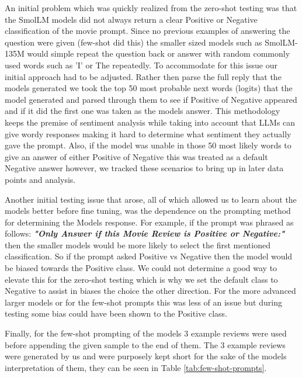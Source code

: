 \documentclass[10pt,twocolumn,letterpaper]{article}
\begin{document}
An initial problem which was quickly realized from the zero-shot testing was that the SmolLM models did not always return a clear Positive or Negative classification of the movie prompt. Since no previous examples of answering the question were given (few-shot did this) the smaller sized models such as SmolLM-135M would simple repeat the question back or answer with random commonly used words such as 'I' or The repeatedly. To accommodate for this issue our initial approach had to be adjusted. Rather then parse the full reply that the models generated we took the top 50 most probable next words (logits) that the model generated and parsed through them to see if Positive of Negative appeared and if it did the first one was taken as the models answer. This methodology keeps the premise of sentiment analysis while taking into account that LLMs can give wordy responses making it hard to determine what sentiment they actually gave the prompt. Also, if the model was unable in those 50 most likely words to give an answer of either Positive of Negative this was treated as a default Negative answer however, we tracked these scenarios to bring up in later data points and analysis. 

Another initial testing issue that arose, all of which allowed us to learn about the models better before fine tuning, was the dependence on the prompting method for determining the Models response. For example, if the prompt was phrased as follows: \textit{\textbf{"Only Answer if this Movie Review is Positive or Negative:"}} then the smaller models would be more likely to select the first mentioned classification. So if the prompt asked Positive vs Negative then the model would be biased towards the Positive class. We could not determine a good way to elevate this for the zero-shot testing which is why we set the default class to Negative to assist in biases the choice the other direction. For the more advanced larger models or for the few-shot prompts this was less of an issue but during testing some bias could have been shown to the Positive class. 

Finally, for the few-shot prompting of the models 3 example reviews were used before appending the given sample to the end of them. The 3 example reviews were generated by us and were purposely kept short for the sake of the models interpretation of them, they can be seen in Table \ref{tab:few-shot-prompts}.
\end{document}
